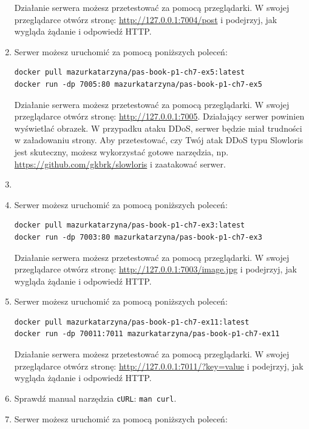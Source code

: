 \begin{enumerate}[label=\textbf{7.\arabic*}]
\noindent Działanie serwera możesz przetestować za pomocą przeglądarki. W swojej przeglądarce otwórz stronę: \url{http://127.0.0.1:7004/post} i podejrzyj, jak wygląda żądanie i odpowiedź HTTP.
\item Serwer możesz uruchomić za pomocą poniższych poleceń:

\begin{verbatim}
docker pull mazurkatarzyna/pas-book-p1-ch7-ex5:latest
docker run -dp 7005:80 mazurkatarzyna/pas-book-p1-ch7-ex5
\end{verbatim}

\noindent Działanie serwera możesz przetestować za pomocą przeglądarki. W swojej przeglądarce otwórz stronę: \url{http://127.0.0.1:7005}. Działający serwer powinien wyświetlać obrazek. W przypadku ataku DDoS, serwer będzie miał trudności w załadowaniu strony. Aby przetestować, czy Twój atak DDoS typu Slowloris jest skuteczny, możesz wykorzystać gotowe narzędzia, np. \url{https://github.com/gkbrk/slowloris} i zaatakować serwer.


\item 

\item \addtocounter{enumi}{3} Serwer możesz uruchomić za pomocą poniższych poleceń:

\begin{verbatim}
docker pull mazurkatarzyna/pas-book-p1-ch7-ex3:latest
docker run -dp 7003:80 mazurkatarzyna/pas-book-p1-ch7-ex3
\end{verbatim}

\noindent Działanie serwera możesz przetestować za pomocą przeglądarki. W swojej przeglądarce otwórz stronę: \url{http://127.0.0.1:7003/image.jpg} i podejrzyj, jak wygląda żądanie i odpowiedź HTTP.
\item Serwer możesz uruchomić za pomocą poniższych poleceń:

\begin{verbatim}
docker pull mazurkatarzyna/pas-book-p1-ch7-ex11:latest
docker run -dp 70011:7011 mazurkatarzyna/pas-book-p1-ch7-ex11
\end{verbatim}

\noindent Działanie serwera możesz przetestować za pomocą przeglądarki. W swojej przeglądarce otwórz stronę: \url{http://127.0.0.1:7011/?key=value} i podejrzyj, jak wygląda żądanie i odpowiedź HTTP.
\item Sprawdź manual narzędzia \texttt{cURL}: \texttt{man curl}.
\item Serwer możesz uruchomić za pomocą poniższych poleceń:


\end{enumerate}
